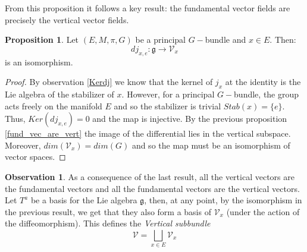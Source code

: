 \documentclass[12pt,a4paper]{report}
\theoremstyle{definition}
\theoremstyle{Theorem}
\newtheorem{Prop}[Def]{Proposition}
\theoremstyle{definition}
\theoremstyle{definition}
\newtheorem{Obs}[Def]{Observation}
\begin{document}
	From this proposition it follows a key result: the fundamental vector fields are precisely the vertical vector fields.
	\begin{Prop}
		Let $(E,M,\pi,G)$ be a principal $G-$bundle and $x\in E$. Then: 
		$$dj_{x,e}:\mathfrak{g}\rightarrow \mathcal{V}_{x}$$ is an isomorphism.
	\end{Prop}
	\begin{proof}
		By observation \ref{Kerdj} we know that the kernel of $j_x$ at the identity is the Lie algebra of the stabilizer of $x$. However, for a principal $G-$bundle, the group acts freely on the manifold $E$ and so the stabilizer is trivial $Stab(x)=\{e\}$. Thus, $Ker (dj_{x,e})=0$ and the map is injective. By the previous proposition \ref{fund_vec_are_vert} the image of the differential lies in the vertical subspace. Moreover, $dim(\mathcal{V}_{x})=dim(G)$ and so the map must be an isomorphism of vector spaces.			
	\end{proof}
	\begin{Obs}
		As a consequence of the last result, all the vertical vectors are the fundamental vectors and all the fundamental vectors are the vertical vectors.\\
		Let $T^a$ be a basis for the Lie algebra $\mathfrak{g}$, then, at any point, by the isomorphism in the previous result, we get that they also form a basis of $\mathcal{V}_{x}$ (under the action of the diffeomorphism). This defines the \textit{Vertical subbundle} $$\mathcal{V}=\bigsqcup_{x\in E}\mathcal{V}_{x}$$
	\end{Obs}
\end{document}
